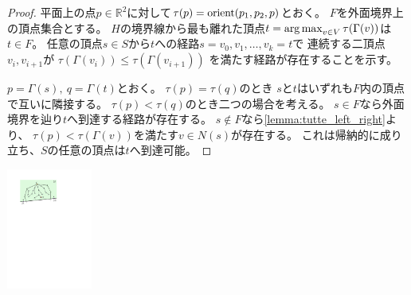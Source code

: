 \vspace*{-0.5\intextsep}
\begin{paracol}{2}
\begin{proof}
平面上の点$p\in \mathbb{R}^2$に対して$\tau(p) = \operatorname{orient}(p_1, p_2, p)$とおく。
$F$を外面境界上の頂点集合とする。
$H$の境界線から最も離れた頂点$t = \operatorname*{arg\,max}_{v\in V}\tau(\Gamma(v))$は$t\in F$。
任意の頂点$s\in S$から$t$への経路$s=v_0, v_1, \ldots, v_k=t$で
連続する二頂点$v_i, v_{i+1}$が
$\tau(\Gamma(v_i)) \leq \tau(\Gamma(v_{i+1}))$ を満たす経路が存在することを示す。

$p=\Gamma(s),~ q=\Gamma(t)$とおく。
$\tau(p) = \tau(q)$のとき
$s$と$t$はいずれも$F$内の頂点で互いに隣接する。
%
$\tau(p) < \tau(q)$のとき二つの場合を考える。
$s \in F$なら外面境界を辿り$t$へ到達する経路が存在する。
$s \notin F$なら\cref{lemma:tutte_left_right}より、
$\tau(p) < \tau(\Gamma(v))$を満たす$v \in N(s)$が存在する。
これは帰納的に成り立ち、$S$の任意の頂点は$t$へ到達可能。
\end{proof}
\switchcolumn
\vspace{1.5\intextsep}
\centering
\includegraphics[width=0.21\textwidth]{figures/tutte_connected.pdf}
\end{paracol}




